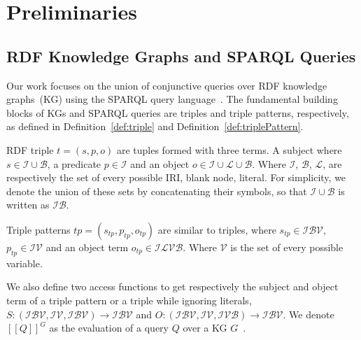 \section{Preliminaries}\label{sec:preliminaries}

\subsection{RDF Knowledge Graphs and SPARQL Queries}

Our work focuses on the union of conjunctive queries over RDF knowledge graphs~(KG) using the SPARQL query language~\cite{w3SPARQLQuery}.
The fundamental building blocks of KGs and SPARQL queries are triples and triple patterns, respectively, as defined in Definition~\ref{def:triple} and Definition~\ref{def:triplePattern}.

\begin{definition}[Triple]\label{def:triple}
    RDF triple $t = (s,p,o)$ are tuples formed with three terms. A subject where $s \in \mathcal{I} \cup \mathcal{B}$, a predicate $p \in \mathcal{I}$ and an object $o \in \mathcal{I} \cup \mathcal{L} \cup \mathcal{B}$.
    Where $\mathcal{I}$, $\mathcal{B}$, $\mathcal{L}$,  are respectively the set of every possible IRI, blank node, literal.
    For simplicity, we denote the union of these sets by concatenating their symbols, so that $ \mathcal{I} \cup \mathcal{B}$ is written as $ \mathcal{I} \mathcal{B}$.
\end{definition}

\begin{definition}\label{def:triplePattern}
    Triple patterns $tp = (s_{tp}, p_{tp}, o_{tp})$ are similar to triples, where $s_{tp} \in \mathcal{I} \mathcal{B} \mathcal{V}$,
    $p_{tp} \in \mathcal{I} \mathcal{V}$ and an object term  $o_{tp} \in \mathcal{I} \mathcal{L} \mathcal{V} \mathcal{B}$.
    Where $\mathcal{V}$ is the set of every possible variable.
\end{definition}

We also define two access functions to get respectively the subject and object term of a triple pattern or a triple while ignoring literals,
$ S:  (\mathcal{I} \mathcal{B} \mathcal{V}, \mathcal{I} \mathcal{V}, \mathcal{I} \mathcal{B} \mathcal{V}) \rightarrow \mathcal{I} \mathcal{B} \mathcal{V}$ and $O: (\mathcal{I} \mathcal{B} \mathcal{V}, \mathcal{I} \mathcal{V}, \mathcal{I} \mathcal{V} \mathcal{B}) \rightarrow \mathcal{I} \mathcal{B} \mathcal{V}$.
We denote $[\![ Q ]\!]^{G}$ as the evaluation of a query $Q$ over a KG $G$~\cite{Angles2008}.

